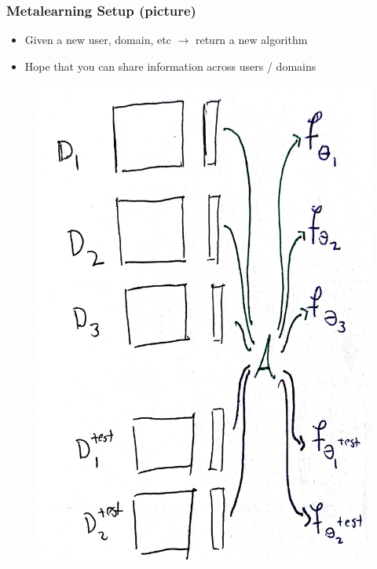 \documentclass[10pt,mathserif]{beamer}
\begin{document}
\begin{frame}
  \frametitle{Metalearning Setup (picture)}
  \begin{itemize}
  \item Given a new user, domain, etc $\rightarrow$ return a new algorithm
  \item Hope that you can share information across users / domains
  \end{itemize}
  \begin{figure}[ht]
    \centering
    \includegraphics[width=0.3\paperwidth]{figure/metalearning_setup_boxes}
    \caption{\label{fig:metalearning_setup_boxes}}
  \end{figure}
\end{frame}
\end{document}
